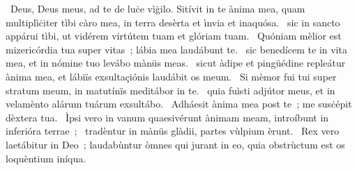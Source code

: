 \psalmChapterWithInscription{}
{ }
{%
~Deus, Deus meus, ad te de luċe vìġilo. Sitívit in te ànima mea, quam multiplìċiter tìbi càro mea, in terra desèrta et ìnvia et inaquósa. 
~sic in sancto appárui tìbi, ut vidérem virtútem tuam et glóriam tuam. 
~Quóniam mèlior est mizericórdia tua super vitas~; lábia mea laudábunt te. 
~sic benedícem te in vita mea, et in nómine tuo levábo mànüs meas. 
~sicut àdipe et pingüédine repleátur ànima mea, et lábiïs exsultaçiónis laudábit os meum. 
~Si mèmor fui tui super stratum meum, in matutínïs meditábor in te. 
~quia fuìsti adjútor meus, et in velamènto alárum tuárum exsultábo. 
~Adháesit ànima mea post te~; me susċépit dèxtera tua. 
~Ìpsi vero in vanum quaesivérunt ànimam meam, introíbunt in inferióra terrae~; 
~tradèntur in mànüs glàdii, partes vùlpium èrunt. 
~Rex vero laetábitur in Deo~; laudabùntur òmnes qui jurant in eo, quia obstrùctum est os loquèntium iníqua. 
}
